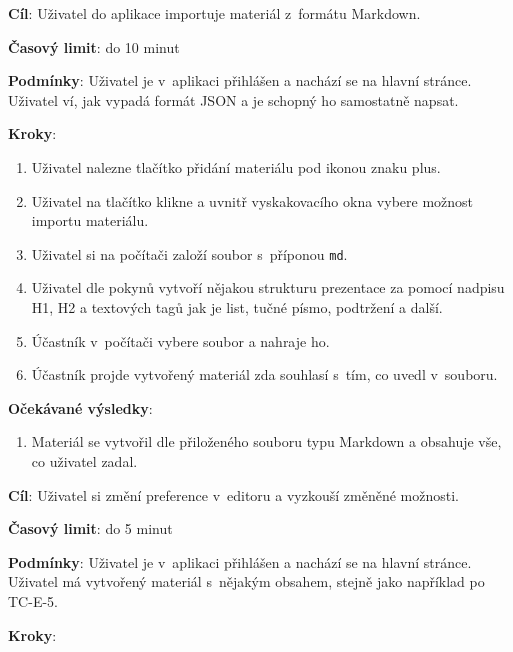 \vspace{1em}

\textbf{Cíl}: Uživatel do aplikace importuje materiál z~formátu Markdown.

\textbf{Časový limit}: do 10 minut

\textbf{Podmínky}:  Uživatel je v~aplikaci přihlášen a nachází se na hlavní stránce. Uživatel ví, jak vypadá formát JSON a je schopný ho samostatně napsat.

\textbf{Kroky}:

\begin{enumerate}[leftmargin=1.4cm]
    \item Uživatel nalezne tlačítko přidání materiálu pod ikonou znaku plus.
    \item Uživatel na tlačítko klikne a uvnitř vyskakovacího okna vybere možnost importu materiálu.
    \item Uživatel si na počítači založí soubor s~příponou \verb|md|.
    \item Uživatel dle pokynů vytvoří nějakou strukturu prezentace za pomocí nadpisu H1, H2 a textových tagů jak je list, tučné písmo, podtržení a další.
    \item Účastník v~počítači vybere soubor a nahraje ho.
    \item Účastník projde vytvořený materiál zda souhlasí s~tím, co uvedl v~souboru.
\end{enumerate}

\textbf{Očekávané výsledky}:

\begin{enumerate}[leftmargin=1.4cm]
    \item Materiál se vytvořil dle přiloženého souboru typu Markdown a obsahuje vše, co uživatel zadal.
\end{enumerate}





\vspace{1em}

\textbf{Cíl}: Uživatel si změní preference v~editoru a vyzkouší změněné možnosti.

\textbf{Časový limit}: do 5 minut

\textbf{Podmínky}:  Uživatel je v~aplikaci přihlášen a nachází se na hlavní stránce.  Uživatel má vytvořený materiál s~nějakým obsahem, stejně jako například po TC-E-5.

\textbf{Kroky}:

